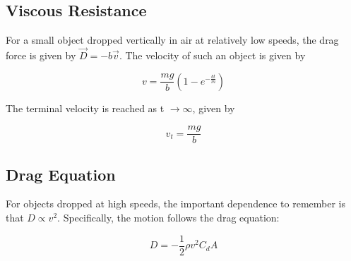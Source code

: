 \documentclass[../PhysicsFormulae.tex]{subfiles}
\begin{document}
\subsection{Viscous Resistance}
For a small object dropped vertically in air at relatively low speeds, the drag force is given by $\vec{D}=-b\vec{v}$. The velocity of such an object is given by

\[v = \frac{mg}{b}\left(1-e^{-\frac{bt}{m}}\right)\]

The terminal velocity is reached as t $\rightarrow \infty $, given by

\[v_t = \frac{mg}{b}\]

\subsection{Drag Equation}
For objects dropped at high speeds, the important dependence to remember is that $D \propto v^2 $. Specifically, the motion follows the drag equation: 

\[D = -\frac{1}{2}\rho v^2 C_d A\]
\end{document}
